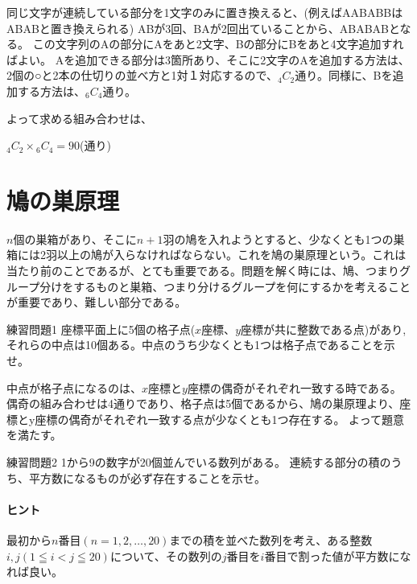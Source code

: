 \documentclass[uplatex,fleqn]{jsbook}
\begin{document}
\begin{answer}
    同じ文字が連続している部分を1文字のみに置き換えると、(例えばAABABBはABABと置き換えられる)
    ABが3回、BAが2回出ていることから、ABABABとなる。
    この文字列のAの部分にAをあと2文字、Bの部分にBをあと4文字追加すればよい。
    Aを追加できる部分は3箇所あり、そこに2文字のAを追加する方法は、2個の○と2本の仕切りの並べ方と1対１対応するので、${}_4{C}_2$通り。同様に、Bを追加する方法は、${}_6{C}_4$通り。

    よって求める組み合わせは、

    ${}_4{C}_2 \times {}_6{C}_4=90$(通り)
\end{answer}

\section{鳩の巣原理}
$n$個の巣箱があり、そこに$n+1$羽の鳩を入れようとすると、少なくとも1つの巣箱には2羽以上の鳩が入らなければならない。これを鳩の巣原理という。これは当たり前のことであるが、とても重要である。問題を解く時には、鳩、つまりグループ分けをするものと巣箱、つまり分けるグループを何にするかを考えることが重要であり、難しい部分である。

\begin{problem}{練習問題1}
    座標平面上に5個の格子点($x$座標、$y$座標が共に整数である点)があり,
    それらの中点は10個ある。中点のうち少なくとも1つは格子点であることを示せ。
\end{problem}

\begin{answer}
    中点が格子点になるのは、$x$座標と$y$座標の偶奇がそれぞれ一致する時である。
    偶奇の組み合わせは4通りであり、格子点は5個であるから、鳩の巣原理より、座標とy座標の偶奇がそれぞれ一致する点が少なくとも1つ存在する。
    よって題意を満たす。
\end{answer}

\begin{problem}{練習問題2}
    1から9の数字が20個並んでいる数列がある。
    連続する部分の積のうち、平方数になるものが必ず存在することを示せ。
\end{problem}

\paragraph{ヒント}最初から$n$番目$(n=1,2,\dots,20)$までの積を並べた数列を考え、ある整数$i,j( 1 \leqq i < j \leqq 20 )$について、その数列の$j$番目を$i$番目で割った値が平方数になれば良い。
\end{document}
